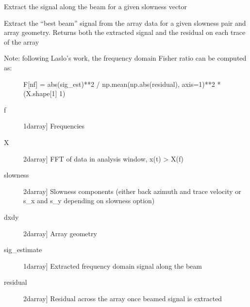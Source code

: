 \documentclass[letterpaper,10pt,english]{sphinxmanual}
\begin{document}
\begin{fulllineitems}
\label{\detokenize{infrapy.detection:infrapy.detection.beamforming_new.extract_signal}}
Extract the signal along the beam for a given slowness vector

Extract the “best beam” signal from the array data for a given slowness pair and
array geometry.  Returns both the extracted signal and the residual on each trace
of the array
\begin{description}
\item[{Note: following Laslo’s work, the frequency domain Fisher ratio can be computed as:}] \leavevmode
F{[}nf{]} = abs(sig\_est)**2 / np.mean(np.abs(residual), axis=1)**2 * (X.shape{[}1{]} \sphinxhyphen{} 1)

\end{description}
\begin{description}
\item[{f}] \leavevmode{[}1darray{]}
Frequencies

\item[{X}] \leavevmode{[}2darray{]}
FFT of data in analysis window, x(t) \textendash{}\textgreater{} X(f)

\item[{slowness}] \leavevmode{[}2darray{]}
Slowness components (either back azimuth and trace velocity or
s\_x and s\_y depending on slowness option)

\item[{dxdy}] \leavevmode{[}2darray{]}
Array geometry

\end{description}
\begin{description}
\item[{sig\_estimate}] \leavevmode{[}1darray{]}
Extracted frequency domain signal along the beam

\item[{residual}] \leavevmode{[}2darray{]}
Residual across the array once beamed signal is extracted

\end{description}

\end{fulllineitems}

\end{document}
